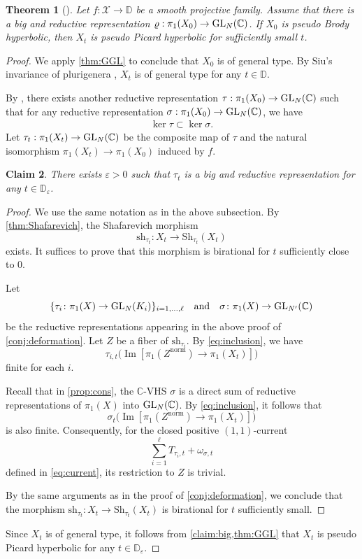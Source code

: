 \documentclass[english]{amsproc}
\theoremstyle{plain}
\newtheorem{thm}{Theorem}[section]
\newtheorem{claim}[thm]{Claim}
\theoremstyle{definition}
\theoremstyle{remark}
\theoremstyle{plain}
\numberwithin{equation}{thm} %
\def\ep{\varepsilon}
\newcommand{\sX}{\mathscr{X}}
\newcommand{\bC}{\mathbb{C}}
\newcommand{\bD}{\mathbb{D}}
\newcommand{\GL}{{\rm GL}}
\begin{document}
 	 
 	\begin{thm}[{\cite[Theorem D]{DMW24}}]\label{main4}
 		Let $f:\sX\to \bD$ be a smooth projective family. Assume that there is a big and reductive representation $\varrho:\pi_1(X_0)\to \GL_N(\bC)$. If $X_0$ is pseudo Brody   hyperbolic, then  $X_t$ is  pseudo Picard hyperbolic for sufficiently small $t$.
 	\end{thm} 
 \begin{proof}
   We apply \cref{thm:GGL} to conclude that $X_0$ is of general type. By Siu's invariance of plurigenera \cite{Siu98,Pau07}, $X_t$ is of general type for any $t\in \bD$.

 By \cite[Lemma 3.25]{DY23}, there exists another reductive  representation $\tau:\pi_1(X_0)\to \GL_N(\bC)$ such that  for any  reductive  representation $\sigma:\pi_1(X_0)\to \GL_N(\bC)$, we have 
 	\begin{align}\label{eq:inclusion}
 		\ker\tau\subset\ker\sigma.
 	\end{align} Let $\tau_t:\pi_1(X_t)\to \GL_N(\bC)$  be the composite map of $\tau$ and the natural isomorphism $\pi_1(X_t)\to \pi_1(X_0)$ induced by $f$. 
 	\begin{claim}\label{claim:big}
 		There exists $\ep>0$ such that $\tau_t$ is a big  and reductive representation for any $t\in \bD_\ep$. 
 	\end{claim} 
 	\begin{proof} 
We use the same notation as in the above subsection.
By \cref{thm:Shafarevich}, the Shafarevich morphism
\[
\mathrm{sh}_{\tau_t} \colon X_t \to \mathrm{Sh}_{\tau_t}(X_t)
\]
exists.
It suffices to prove that this morphism is birational for $t$ sufficiently
close to $0$.

Let
\[
\{\tau_i \colon \pi_1(X) \to \GL_N(K_i)\}_{i=1,\ldots,\ell}
\quad \text{and} \quad
\sigma \colon \pi_1(X) \to \GL_{N'}(\bC)
\]
be the reductive representations appearing in the above proof of
\cref{conj:deformation}.
Let $Z$ be a fiber of $\mathrm{sh}_{\tau_t}$.
By \eqref{eq:inclusion}, we have
\[
\tau_{i,t}\bigl(\operatorname{Im}[\pi_1(Z^{\mathrm{norm}})
\to \pi_1(X_t)]\bigr)
\]
finite for each $i$.

Recall that in \cref{prop:cons}, the $\bC$-VHS $\sigma$ is a direct sum of
reductive representations of $\pi_1(X)$ into $\GL_N(\bC)$.
By \eqref{eq:inclusion}, it follows that
\[
\sigma_t\bigl(\operatorname{Im}[\pi_1(Z^{\mathrm{norm}})
\to \pi_1(X_t)]\bigr)
\]
is also finite.
Consequently, for the closed positive $(1,1)$-current
\[
\sum_{i=1}^{\ell} T_{\tau_i,t} + \omega_{\sigma,t}
\]
defined in \eqref{eq:current}, its restriction to $Z$ is trivial.

By the same arguments as in the proof of \cref{conj:deformation}, we conclude
that the morphism
$\mathrm{sh}_{\tau_t} \colon X_t \to \mathrm{Sh}_{\tau_t}(X_t)$
is birational for $t$ sufficiently small.
\end{proof}

Since $X_t$ is of general type, it follows from
\cref{claim:big,thm:GGL} that $X_t$ is pseudo Picard hyperbolic
for any $t \in \bD_\varepsilon$.  
 \end{proof}   
\end{document}
